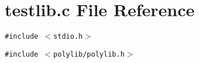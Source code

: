 \section{testlib.c File Reference}
\label{testlib_8c}
{\tt \#include $<$stdio.h$>$}\par
{\tt \#include $<$polylib/polylib.h$>$}\par
